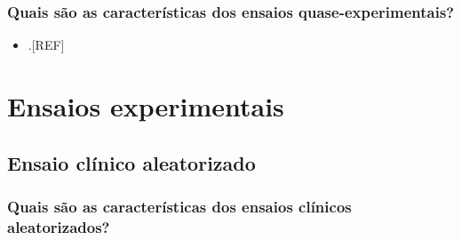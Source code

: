 \documentclass[
  a4paper,
]{book}
\providecommand{\tightlist}{%
  \setlength{\itemsep}{0pt}\setlength{\parskip}{0pt}}
\begin{document}
\hypertarget{quais-suxe3o-as-caracteruxedsticas-dos-ensaios-quase-experimentais}{%
\subsection{Quais são as características dos ensaios quase-experimentais?}\label{quais-suxe3o-as-caracteruxedsticas-dos-ensaios-quase-experimentais}}

\begin{itemize}
\tightlist
\item
  .{[}REF{]}
\end{itemize}

\hypertarget{ensaios-experimentais}{%
\chapter{\texorpdfstring{\textbf{Ensaios experimentais}}{Ensaios experimentais}}\label{ensaios-experimentais}}

\hypertarget{ensaio-clinico-aleatorizado}{%
\section{Ensaio clínico aleatorizado}\label{ensaio-clinico-aleatorizado}}

\hypertarget{quais-suxe3o-as-caracteruxedsticas-dos-ensaios-cluxednicos-aleatorizados}{%
\subsection{Quais são as características dos ensaios clínicos aleatorizados?}\label{quais-suxe3o-as-caracteruxedsticas-dos-ensaios-cluxednicos-aleatorizados}}
\end{document}
